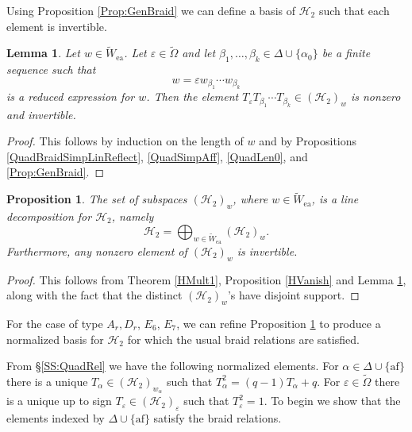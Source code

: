 \documentclass[10pt, letterpaper]{amsart}
\theoremstyle{plain}
\newtheorem{Prop}[equation]{Proposition}
\newtheorem{Lem}[equation]{Lemma}
\theoremstyle{definition}
\numberwithin{equation}{section}
\newcommand{\Wt}{\widetilde{W}}
\newcommand{\Omegat}{\widetilde{\Omega}}
\newcommand{\af}{\mathrm{af}}
\newcommand{\ea}{\mathrm{ea}}
\newcommand{\Hcal}{\mathcal{H}}
\begin{document}
	Using Proposition \ref{Prop:GenBraid} we can define a basis of $\Hcal_{2}$ such that each element is invertible. 
	
	\begin{Lem}\label{SuppComplete}
		Let $w\in \widetilde{W}_{\ea}$. Let $\varepsilon\in\Omegat$ and let $\beta_{1},\ldots,\beta_{k}\in \Delta\cup\{\alpha_{0}\}$ be a finite sequence such that
		\begin{equation*}
			w=\varepsilon w_{\beta_{1}}\cdots w_{\beta_{k}}
		\end{equation*}
		is a reduced expression for $w$. Then the element $T_{\varepsilon}T_{\beta_{1}}\cdots T_{\beta_{k}}\in (\Hcal_{2})_{w}$ is nonzero and invertible.
	\end{Lem}
	
	\begin{proof}
		This follows by induction on the length of $w$ and by Propositions \ref{QuadBraidSimpLinReflect}, \ref{QuadSimpAff}, \ref{QuadLen0}, and \ref{Prop:GenBraid}. 
	\end{proof}
	
	\begin{Prop}\label{HLineDecompAndInvert}
		The set of subspaces $(\Hcal_{2})_{w}$, where $w\in \widetilde{W}_{\ea}$, is a line decomposition for $\Hcal_{2}$, namely
        \[
        \Hcal_2=\bigoplus_{w\in\Wt_{\ea}}(\Hcal_{2})_{w}.
        \]
        Furthermore, any nonzero element of $(\Hcal_{2})_{w}$ is invertible.
	\end{Prop}
	
	\begin{proof}
		This follows from Theorem \ref{HMult1}, Proposition \ref{HVanish} and Lemma \ref{SuppComplete}, along with the fact that the distinct $(\Hcal_{2})_{w}$'s have disjoint support.
	\end{proof}
	
	For the case of type $A_r,D_r$, $E_{6}$, $E_{7}$, we can refine Proposition \ref{HLineDecompAndInvert} to produce a normalized basis for $\Hcal_{2}$ for which the usual braid relations are satisfied.
	
	From \S \ref{SS:QuadRel} we have the following normalized elements. For $\alpha\in\Delta\cup\{\af\}$ there is a unique $T_{\alpha}\in (\Hcal_{2})_{w_{\alpha}}$ such that $T_{\alpha}^{2}=(q-1)T_{\alpha}+q$. For $\varepsilon\in\Omegat$ there is a unique up to sign $T_{\varepsilon}\in (\Hcal_{2})_{\varepsilon}$ such that $T_{\varepsilon}^{2}=1$. To begin we show that the elements indexed by $\Delta\cup\{\af\}$ satisfy the braid relations. 
    
\end{document}
